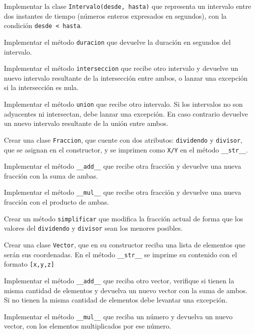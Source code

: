 \begin{ejercicio}
\leavevmode
\begin{partes}
    \item Implementar la clase \lstinline|Intervalo(desde, hasta)| que
        representa un intervalo entre dos instantes de tiempo (números enteros
        expresados en segundos), con la condición \lstinline|desde < hasta|.
    \item Implementar el método \lstinline|duracion| que devuelve la duración
        en segundos del intervalo.
    \item Implementar el método \lstinline|interseccion| que recibe otro
        intervalo y devuelve un nuevo intervalo resultante de la intersección
        entre ambos, o lanzar una excepción si la intersección es nula.
    \item Implementar el método \lstinline|union| que recibe otro
        intervalo. Si los intervalos no son adyacentes ni intersectan, debe
        lanzar una excepción. En caso contrario devuelve un nuevo intervalo
        resultante de la unión entre ambos.
\end{partes}
\end{ejercicio}

\begin{ejercicio}
\leavevmode
\begin{partes}
    \item Crear una clase \verb!Fraccion!, que cuente con dos atributos:
\verb!dividendo! y \verb!divisor!, que se asignan en el constructor, y se
imprimen como \verb!X/Y! en el método \verb!__str__!.
    \item Implementar el método \verb!__add__! que recibe otra fracción y devuelve una
nueva fracción con la suma de ambas.
    \item Implementar el método \verb!__mul__! que recibe otra fracción y
devuelve una nueva fracción con el producto de ambas.
    \item Crear un método \verb!simplificar! que modifica la fracción actual de
forma que los valores del \verb!dividendo! y \verb!divisor! sean los
menores posibles.
\end{partes}
\end{ejercicio}


\begin{ejercicio}
\leavevmode
\begin{partes}
    \item Crear una clase \verb!Vector!, que en su constructor reciba una lista
de elementos que serán sus coordenadas.  En el método \verb!__str__! se
imprime su contenido con el formato \verb![x,y,z]!
    \item Implementar el método \verb!__add__! que reciba otro vector, verifique si
tienen la misma cantidad de elementos y devuelva un nuevo vector con la
suma de ambos.  Si no tienen la misma cantidad de elementos debe levantar
una excepción.
    \item Implementar el método \verb!__mul__! que reciba un número y devuelva un
nuevo vector, con los elementos multiplicados por ese número.
\end{partes}
\end{ejercicio}


